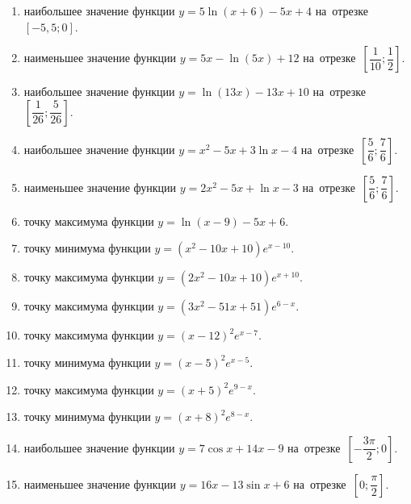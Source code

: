 \documentclass[a4paper,10pt]{article}
\begin{document}
\begin{enumerate}
\item {} наибольшее значение функции $y=5\ln \left(x+6\right)-5x+4$ на~отрезке~$\left[-5,5;0\right]$.

\item {} наименьшее значение функции $y=5x-\ln \left(5x\right)+12$ на~отрезке~$\left[\dfrac{1}{10};\dfrac{1}{2}\right]$.

\item {} наибольшее значение функции $y=\ln \left(13x\right)-13x+10$ на~отрезке~$\left[\dfrac{1}{26};\dfrac{5}{26}\right]$.

\item {} наибольшее значение функции $y=x^2-5x+3\ln x-4$ на~отрезке~$\left[\dfrac{5}{6};\dfrac{7}{6}\right]$.

\item {} наименьшее значение функции $y=2x^2-5x+\ln x-3$ на~отрезке~$\left[\dfrac{5}{6};\dfrac{7}{6}\right]$.

\item {} точку максимума функции $y=\ln \left(x-9\right)-5x+6$.

\item {} точку минимума функции $y=\left(x^2-10x+10\right)e^{x-10}$.

\item {} точку максимума функции $y=\left(2x^2-10x+10\right)e^{x+10}$.

\item {} точку максимума функции $y=\left(3x^2-51x+51\right)e^{6-x}$.

\item {} точку максимума функции $y=\left(x-12\right)^2e^{x-7}$.

\item {} точку минимума функции $y=\left(x-5\right)^2e^{x-5}$.

\item {} точку максимума функции $y=\left(x+5\right)^2e^{9-x}$.

\item {} точку минимума функции $y=\left(x+8\right)^2e^{8-x}$.

\item {} наибольшее значение функции $y=7\cos x+14x-9$ на~отрезке~$\left[-\dfrac{3\pi }{2};0\right]$.

\item {} наименьшее значение функции $y=16x-13\sin x+6$ на~отрезке~$\left[0;\dfrac{\pi }{2}\right]$.


\end{enumerate}
\end{document}
